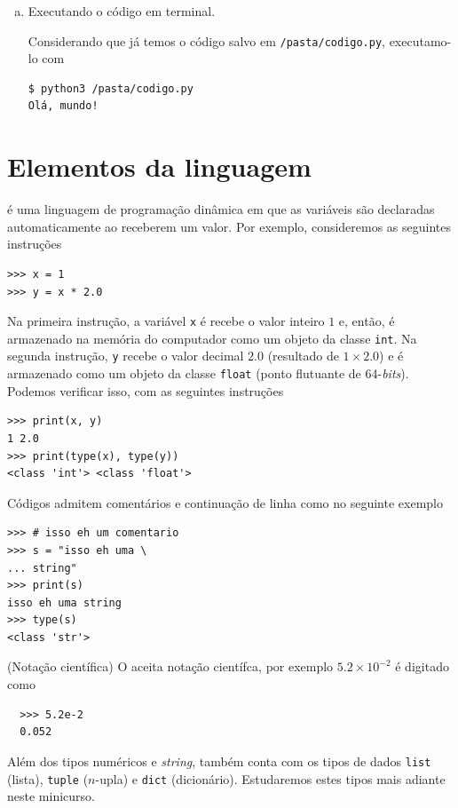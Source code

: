 \documentclass[12pt]{article}
\begin{document}
\begin{ex}
\begin{enumerate}[a)]
  \item Executando o código em terminal.

    Considerando que já temos o código salvo em \verb+/pasta/codigo.py+, executamo-lo com
\begin{verbatim}
$ python3 /pasta/codigo.py
Olá, mundo!
\end{verbatim}
  \end{enumerate}
\end{ex}

\section{Elementos da linguagem}\label{sec_elem}

{\python} é uma linguagem de programação dinâmica em que as variáveis são declaradas automaticamente ao receberem um valor. Por exemplo, consideremos as seguintes instruções
\begin{lstlisting}
>>> x = 1
>>> y = x * 2.0
\end{lstlisting}
Na primeira instrução, a variável \lstinline+x+ é recebe o valor inteiro $1$ e, então, é armazenado na memória do computador como um objeto da classe \lstinline+int+. Na segunda instrução, \lstinline+y+ recebe o valor decimal $2.0$ (resultado de $1\times 2.0$) e é armazenado como um objeto da classe \lstinline+float+ (ponto flutuante de 64-{\it bits}). Podemos verificar isso, com as seguintes instruções
\begin{lstlisting}
>>> print(x, y)
1 2.0
>>> print(type(x), type(y))
<class 'int'> <class 'float'>
\end{lstlisting}

Códigos {\python} admitem comentários e continuação de linha como no seguinte exemplo
\begin{lstlisting}
>>> # isso eh um comentario
>>> s = "isso eh uma \
... string"
>>> print(s)
isso eh uma string
>>> type(s)
<class 'str'>
\end{lstlisting}

\begin{obs}(Notação científica)
  O {\python} aceita notação científca, por exemplo $5.2\times 10^{-2}$ é digitado como
  \begin{lstlisting}
  >>> 5.2e-2
  0.052
  \end{lstlisting}
\end{obs}

\begin{obs}
  Além dos tipos numéricos e {\it string}, {\python} também conta com os tipos de dados \lstinline+list+ (lista), \lstinline+tuple+ ($n$-upla) e \lstinline+dict+ (dicionário). Estudaremos estes tipos mais adiante neste minicurso.
\end{obs}
\end{document}

